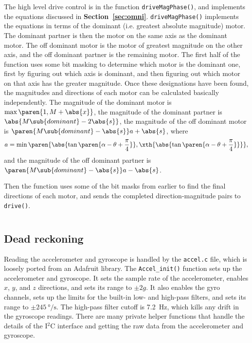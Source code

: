 \documentclass[letterpaper, 11pt]{article}
\newcommand*{\secref}[1]{\textbf{Section~\ref{#1}}}
\newcommand{\iic}{I$^2$C\xspace}
\begin{document}
\begin{mdframed}[backgroundcolor=bg]
    \inputminted[breaklines]{c}{files/excerpts/drive.c}
\end{mdframed}

The high level drive control is in the function \verb|driveMagPhase()|, and implements the equations discussed in \secref{sec:omni}. \verb|driveMagPhase()| implements the equations in terms of the dominant (i.e. greatest absolute magnitude) motor. The dominant partner is then the motor on the same axis as the dominant motor. The off dominant motor is the motor of greatest magnitude on the other axis, and the off dominant partner is the remaining motor. The first half of the function uses some bit masking to determine which motor is the dominant one, first by figuring out which axis is dominant, and then figuring out which motor on that axis has the greater magnitude. Once these designations have been found, the magnitudes and directions of each motor can be calculated basically independently. The magnitude of the dominant motor is $\max\paren{1, M + \abs{x}}$, the magnitude of the dominant partner is $\abs{M\sub{dominant} - 2\abs{s}}$, the magnitude of the off dominant motor is $\paren{M\sub{dominant} - \abs{s}}a + \abs{s}$, where 
\[ a = \min\paren{\abs{\tan\paren{\alpha - \theta + \frac{\pi}{4}}}, \xth{\abs{\tan\paren{\alpha - \theta + \frac{\pi}{4}}}}},\]
and the magnitude of the off dominant partner is $\paren{M\sub{dominant} - \abs{s}}a - \abs{s}$.

Then the function uses some of the bit masks from earlier to find the final directions of each motor, and sends the completed direction-magnitude pairs to \verb|drive()|.

\begin{mdframed}[backgroundcolor=bg]
    \inputminted[breaklines]{c}{files/excerpts/driveMagPhase.c}
\end{mdframed}

\subsection{Dead reckoning}
Reading the accelerometer and gyroscope is handled by the \verb|accel.c| file, which is loosely ported from an Adafruit library. The \verb|Accel_init()| function sets up the accelerometer and gyroscope. It sets the sample rate of the accelerometer, enables $x$, $y$, and $z$ directions, and sets its range to $\pm 2g$. It also enables the gyro channels, sets up the limits for the built-in low- and high-pass filters, and sets its range to $\pm \SI{245}{\degree\per\second}$. The high-pass filter cutoff is \SI{7.2}{Hz}, which kills any drift in the gyroscope readings. There are many private helper functions that handle the details of the \iic interface and getting the raw data from the accelerometer and gyroscope. 
\end{document}

